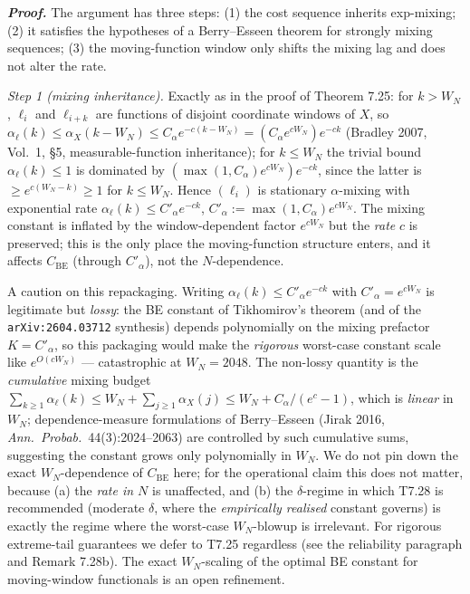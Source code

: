 \documentclass[
]{article}
\begin{document}
\emph{\textbf{Proof.}} The argument has three steps: (1) the cost
sequence inherits exp-mixing; (2) it satisfies the hypotheses of a
Berry--Esseen theorem for strongly mixing sequences; (3) the
moving-function window only shifts the mixing lag and does not alter
the rate.

\emph{Step 1 (mixing inheritance).} Exactly as in the proof of
Theorem 7.25: for $k > W_N$, $\ell_i$ and $\ell_{i+k}$ are functions of
disjoint coordinate windows of $X$, so $\alpha_\ell(k) \leq
\alpha_X(k - W_N) \leq C_\alpha e^{-c(k - W_N)} = (C_\alpha e^{c W_N})
e^{-c k}$ (Bradley 2007, Vol.~1, §5, measurable-function inheritance);
for $k \leq W_N$ the trivial bound $\alpha_\ell(k) \leq 1$ is dominated
by $(\max(1,C_\alpha) e^{c W_N}) e^{-c k}$, since the latter is
$\geq e^{c(W_N - k)} \geq 1$ for $k \leq W_N$. Hence $(\ell_i)$ is
stationary $\alpha$-mixing with exponential rate $\alpha_\ell(k) \leq
C'_\alpha e^{-c k}$, $C'_\alpha := \max(1, C_\alpha) e^{c W_N}$. The
mixing constant is inflated by the window-dependent factor $e^{c W_N}$
but the \emph{rate} $c$ is preserved; this is the only place the
moving-function structure enters, and it affects $C_{\mathrm{BE}}$
(through $C'_\alpha$), not the $N$-dependence.

A caution on this repackaging. Writing $\alpha_\ell(k) \leq C'_\alpha
e^{-ck}$ with $C'_\alpha = e^{c W_N}$ is legitimate but \emph{lossy}:
the BE constant of Tikhomirov's theorem (and of the
\texttt{arXiv:2604.03712} synthesis) depends polynomially on the
mixing prefactor $K = C'_\alpha$, so this packaging would make the
\emph{rigorous} worst-case constant scale like $e^{O(c W_N)}$ ---
catastrophic at $W_N = 2048$. The non-lossy quantity is the
\emph{cumulative} mixing budget $\sum_{k \geq 1} \alpha_\ell(k) \leq
W_N + \sum_{j \geq 1}\alpha_X(j) \leq W_N + C_\alpha/(e^c - 1)$, which
is \emph{linear} in $W_N$; dependence-measure formulations of
Berry--Esseen (Jirak 2016, \emph{Ann.\ Probab.}\ 44(3):2024--2063) are
controlled by such cumulative sums, suggesting the constant grows only
polynomially in $W_N$. We do not pin down the exact $W_N$-dependence
of $C_{\mathrm{BE}}$ here; for the operational claim this does not
matter, because (a) the \emph{rate in $N$} is unaffected, and (b) the
$\delta$-regime in which T7.28 is recommended (moderate $\delta$, where
the \emph{empirically realised} constant governs) is exactly the regime
where the worst-case $W_N$-blowup is irrelevant. For rigorous
extreme-tail guarantees we defer to T7.25 regardless (see the
reliability paragraph and Remark 7.28b). The exact $W_N$-scaling of the
optimal BE constant for moving-window functionals is an open
refinement.
\end{document}
